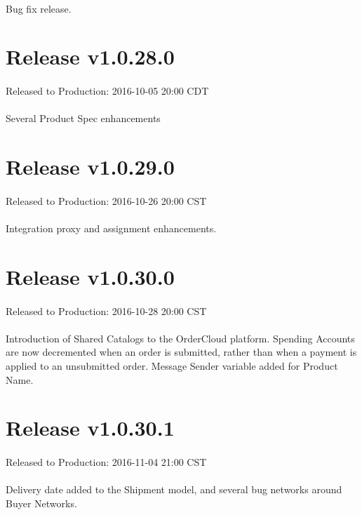 \documentclass{memoir}%
\begin{document}
%
\paragraph*{}%
Bug fix release.

%
\section*{Release v1.0.28.0}%
\paragraph*{}%
Released to Production: 2016{-}10{-}05 20:00 CDT

%
\paragraph*{}%
Several Product Spec enhancements

%
\section*{Release v1.0.29.0}%
\paragraph*{}%
Released to Production: 2016{-}10{-}26 20:00 CST

%
\paragraph*{}%
Integration proxy and assignment enhancements.

%
\section*{Release v1.0.30.0}%
\paragraph*{}%
Released to Production: 2016{-}10{-}28 20:00 CST

%
\paragraph*{}%
Introduction of Shared Catalogs to the OrderCloud platform. Spending Accounts are now decremented when an order is submitted, rather than when a payment is applied to an unsubmitted order. Message Sender variable added for Product Name.

%
\section*{Release v1.0.30.1}%
\paragraph*{}%
Released to Production: 2016{-}11{-}04 21:00 CST

%
\paragraph*{}%
Delivery date added to the Shipment model, and several bug networks around Buyer Networks.

%
\end{document}
